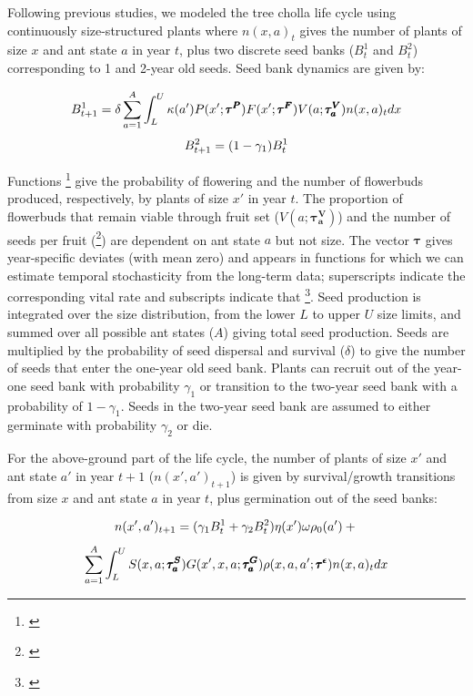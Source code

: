\documentclass[11pt]{article}
\newcommand{\tom}[2]{{\color{red}{#1}}\footnote{\textit{\color{red}{#2}}}}
\begin{document}
Following previous studies, we modeled the tree cholla life cycle using continuously size-structured plants where $n(x,a)_{t}$ gives the number of plants of size $x$ and ant state $a$ in year $t$, plus two discrete seed banks ($B^1_{t}$ and $B^2_{t}$) corresponding to 1 and 2-year old seeds. 
Seed bank dynamics are given by:

\begin{linenomath*}
	$$
	B^1_{t+1} = \delta \sum_{a=1}^{A} \int_L^U  \kappa(a') P(x';\pmb{\tau^P}) F(x';\pmb{\tau^F}) V(a;\pmb{\tau^V_{a}}) n(x,a)_{t} dx \\
	$$
	$$
	B^2_{t+1} =  (1 - \gamma_1)B^1_{t}\\
	$$
\end{linenomath*}

\noindent Functions \tom{$P(x';\pmb{\tau^P})$ and $F(x';\pmb{\tau^F})$}{These should be $x$ not $x'$ because we modeled flowering and fertility in year t based on size in year t.} give the probability of flowering and the number of flowerbuds produced, respectively, by plants of size $x'$ in year $t$. 
The proportion of flowerbuds that remain viable through fruit set ($V(a;\pmb{\tau^V_{a}})$) and the number of seeds per fruit (\tom{$\kappa(a')$}{Why is this $a'$? I think it should be $a$. More generally, I think you need to explain your use of primes and how readers should interpret them at the start of model exposition.}) are dependent on ant state $a$ but not size. 
The vector $\pmb{\tau}$ gives year-specific deviates (with mean zero) and appears in functions for which we can estimate temporal stochasticity from the long-term data; superscripts indicate the corresponding vital rate and subscripts indicate that \tom{deviates are specific to plants in ant state $a$}{Why does the tau vector for viability have the $a$ subscript but the others do not?}. 
Seed production is integrated over the size distribution, from the lower $L$ to upper $U$ size limits, and summed over all possible ant states ($A$) giving total seed production. 
Seeds are multiplied by the probability of seed dispersal and survival ($\delta$) to give the number of seeds that enter the one-year old seed bank. 
Plants can recruit out of the year-one seed bank with probability $\gamma_1$ or transition to the two-year seed bank with a probability of $1 - \gamma_1$. 
Seeds in the two-year seed bank are assumed to either germinate with probability $\gamma_2$ or die. 

For the above-ground part of the life cycle, the number of plants of size $x'$ and ant state $a'$ in year $t+1$ ($n(x',a')_{t+1}$) is given by survival/growth transitions from size $x$ and ant state $a$ in year $t$, plus germination out of the seed banks:
\begin{linenomath*}
	$$
	n(x',a')_{t+1} = (\gamma_1 B^1_{t} + \gamma_2 B^2_{t} ) \eta(x') \omega \rho_{0}(a')  + \\
	$$
	$$
	\sum_{a=1}^{A} \int_L^U S(x,a;\pmb{\tau^S_{a}}) G(x',x,a;\pmb{\tau^G_{a}}) \rho(x,a,a';\pmb{\tau^{\epsilon}}) n(x,a)_t dx \\
	$$
\end{linenomath*}
\end{document}
